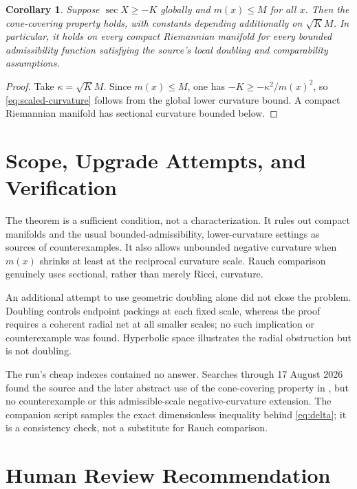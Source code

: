 \documentclass[11pt]{article}
\newtheorem{corollary}{Corollary}
\begin{document}
\begin{corollary}\label{cor:global}
Suppose $\sec X\geq-K$ globally and $m(x)\leq M$ for all $x$.  Then the
cone-covering property holds, with constants depending additionally on
$\sqrt K M$.  In particular, it holds on every compact Riemannian manifold
for every bounded admissibility function satisfying the source's local
doubling and comparability assumptions.
\end{corollary}

\begin{proof}
Take $\kappa=\sqrt K M$.  Since $m(x)\leq M$, one has
$-K\geq-\kappa^2/m(x)^2$, so \eqref{eq:scaled-curvature} follows from the
global lower curvature bound.  A compact Riemannian manifold has sectional
curvature bounded below.
\end{proof}

\section*{Scope, Upgrade Attempts, and Verification}

The theorem is a sufficient condition, not a characterization.  It rules
out compact manifolds and the usual bounded-admissibility, lower-curvature
settings as sources of counterexamples.  It also allows unbounded negative
curvature when $m(x)$ shrinks at least at the reciprocal curvature scale.
Rauch comparison genuinely uses sectional, rather than merely Ricci,
curvature.

An additional attempt to use geometric doubling alone did not close the
problem.  Doubling controls endpoint packings at each fixed scale, whereas
the proof requires a coherent radial net at all smaller scales; no such
implication or counterexample was found.  Hyperbolic space illustrates the
radial obstruction but is not doubling.

The run's cheap indexes contained no answer.  Searches through 17 August
2026 found the source and the later abstract use of the cone-covering
property in \cite{K}, but no counterexample or this admissible-scale
negative-curvature extension.  The companion script samples the exact
dimensionless inequality behind \eqref{eq:delta}; it is a consistency check,
not a substitute for Rauch comparison.

\section*{Human Review Recommendation}
\end{document}
